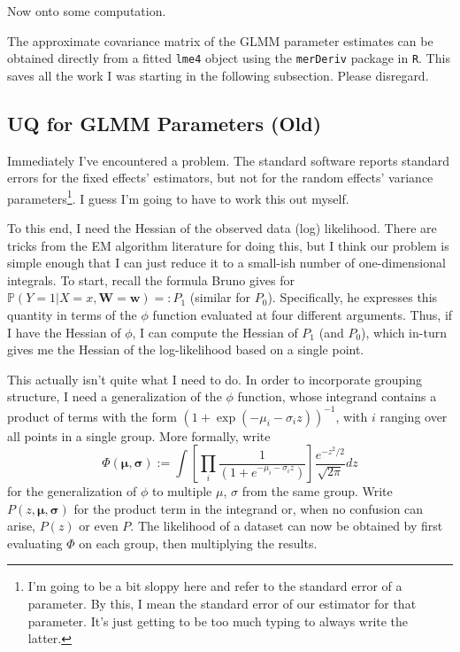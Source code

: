 \documentclass{article}
\newcommand{\bP}{\mathbb{P}}
\begin{document}
Now onto some computation.

The approximate covariance matrix of the GLMM parameter estimates can be obtained directly from a fitted \texttt{lme4} object using the \texttt{merDeriv} package in \texttt{R}. This saves all the work I was starting in the following subsection. Please disregard.

\subsection{UQ for GLMM Parameters (Old)}

Immediately I've encountered a problem. The standard software reports standard errors for the fixed effects' estimators, but not for the random effects' variance parameters\footnote{I'm going to be a bit sloppy here and refer to the standard error of a parameter. By this, I mean the standard error of our estimator for that parameter. It's just getting to be too much typing to always write the latter.}. I guess I'm going to have to work this out myself.

To this end, I need the Hessian of the observed data (log) likelihood. There are tricks from the EM algorithm literature for doing this, but I think our problem is simple enough that I can just reduce it to a small-ish number of one-dimensional integrals. To start, recall the formula Bruno gives for $\bP(Y=1 | X=x, \mathbf{W}=\mathbf{w}) =: P_1$ (similar for $P_0$). Specifically, he expresses this quantity in terms of the $\phi$ function evaluated at four different arguments. Thus, if I have the Hessian of $\phi$, I can compute the Hessian of $P_1$ (and $P_0$), which in-turn gives me the Hessian of the log-likelihood based on a single point. 

This actually isn't quite what I need to do. In order to incorporate grouping structure, I need a generalization of the $\phi$ function, whose integrand contains a product of terms with the form $(1 + \exp(-\mu_i - \sigma_i z))^{-1}$, with $i$ ranging over all points in a single group. More formally, write
%
\begin{equation}
    \Phi(\bm{\mu}, \bm{\sigma}) := \int \left[ \prod_i \frac{1}{\left( 1 + e^{-\mu_i - \sigma_i z} \right)} \right] \frac{e^{-z^2/2}}{\sqrt{2\pi}} dz
\end{equation}
%
for the generalization of $\phi$ to multiple $\mu$, $\sigma$ from the same group. Write $P(z, \bm{\mu}, \bm{\sigma})$ for the product term in the integrand or, when no confusion can arise, $P(z)$ or even $P$. The likelihood of a dataset can now be obtained by first evaluating $\Phi$ on each group, then multiplying the results.
\end{document}
